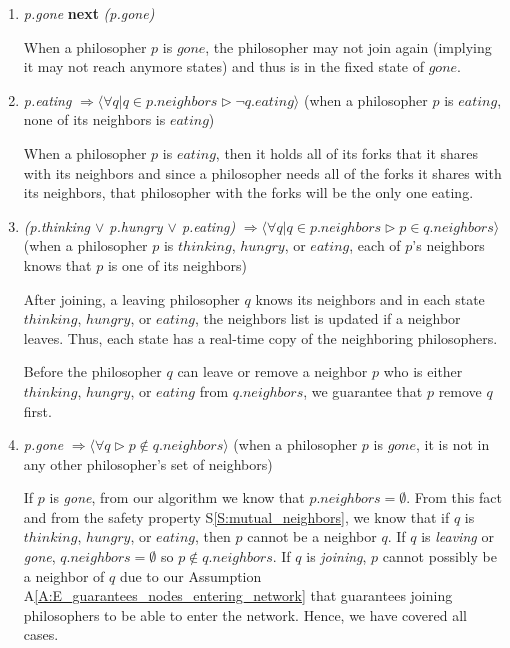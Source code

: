 \documentclass[11pt]{article}
\begin{document}
\begin{enumerate}[S1]
\item {\it p.gone} {\bfseries next} {\it (p.gone)}

When a philosopher $p$ is $gone$, the philosopher may not join again (implying it may not reach anymore states) and thus is in the fixed state of $gone$.

\item {\it p.eating} $\Rightarrow \langle \forall q | q \in p.neighbors \rhd \neg q.eating \rangle$
(when a philosopher $p$ is $eating$, none of its neighbors is $eating$)

When a philosopher $p$ is $eating$, then it holds all of its forks that it shares with its neighbors and since a philosopher needs all of the forks it shares with its neighbors, that philosopher with the forks will be the only one eating.


\item \label{S:mutual_neighbors} {\it (p.thinking $\vee$ p.hungry $\vee$ p.eating)} $\Rightarrow \langle \forall q | q \in p.neighbors \rhd p \in q.neighbors \rangle$
(when a philosopher $p$ is $thinking$, $hungry$, or $eating$, each of $p$'s neighbors knows that $p$ is one of its neighbors)

After joining, a leaving philosopher $q$ knows its neighbors and in each state $thinking$, $hungry$, or $eating$, the neighbors list is updated if a neighbor leaves. Thus, each state has a real-time copy of the neighboring philosophers.

Before the philosopher $q$ can leave or remove a neighbor $p$ who is either $thinking$, $hungry$, or $eating$ from $q.neighbors$, we guarantee that $p$ remove $q$ first.

\item {\it p.gone} $\Rightarrow \langle \forall q  \rhd p\not\in q.neighbors \rangle$
(when a philosopher $p$ is $gone$, it is not in any other philosopher's set of neighbors)

If $p$ is \emph{gone}, from our algorithm we know that $p.neighbors = \emptyset$. From this fact and from the safety property S\ref{S:mutual_neighbors}, we know that if $q$ is $thinking$, $hungry$, or $eating$, then $p$ cannot be a neighbor $q$. If $q$ is \emph{leaving} or \emph{gone}, $q.neighbors = \emptyset$ so $p\not\in q.neighbors.$ If $q$ is \emph{joining}, $p$ cannot possibly be a neighbor of $q$ due to our Assumption A\ref{A:E_guarantees_nodes_entering_network} that guarantees joining philosophers to be able to enter the network. Hence, we have covered all cases.




\end{enumerate}
\end{document}

